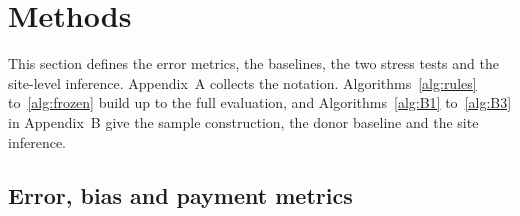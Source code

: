 \section{Methods}\label{sec:methods}

This section defines the error metrics, the baselines, the two stress tests and the site-level inference. Appendix~A collects the notation. Algorithms~\ref{alg:rules} to~\ref{alg:frozen} build up to the full evaluation, and Algorithms~\ref{alg:B1} to~\ref{alg:B3} in Appendix~B give the sample construction, the donor baseline and the site inference.

\subsection{Error, bias and payment metrics}\label{sec:methods:metrics}

